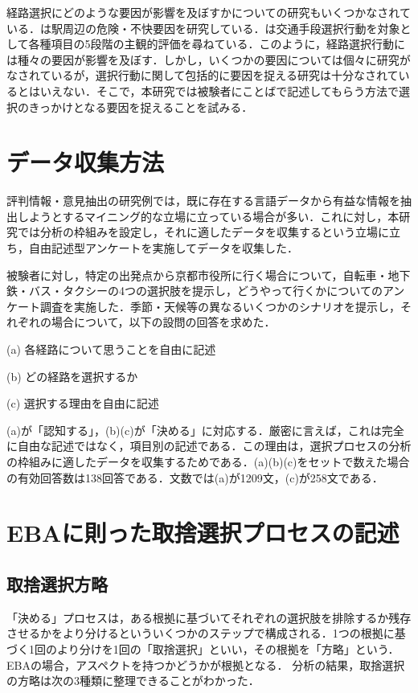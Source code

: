 \documentclass[japanese]{jnlp_1.3a}
\begin{document}
経路選択にどのような要因が影響を及ぼすかについての研究もいくつかなされている．は駅周辺の危険・不快要因を研究している．は交通手段選択行動を対象として各種項目の5段階の主観的評価を尋ねている．このように，経路選択行動には種々の要因が影響を及ぼす．しかし，いくつかの要因については個々に研究がなされているが，選択行動に関して包括的に要因を捉える研究は十分なされているとはいえない．そこで，本研究では被験者にことばで記述してもらう方法で選択のきっかけとなる要因を捉えることを試みる．

\section{データ収集方法}
\label{sec:datacollect}

評判情報・意見抽出の研究例では，既に存在する言語データから有益な情報を抽出しようとするマイニング的な立場に立っている場合が多い．これに対し，本研究では分析の枠組みを設定し，それに適したデータを収集するという立場に立ち，自由記述型アンケートを実施してデータを収集した．

被験者に対し，特定の出発点から京都市役所に行く場合について，自転車・地下鉄・バス・タクシーの4つの選択肢を提示し，どうやって行くかについてのアンケート調査を実施した．季節・天候等の異なるいくつかのシナリオを提示し，それぞれの場合について，以下の設問の回答を求めた．
	\begin{description}
	\item{(a)} 各経路について思うことを自由に記述
	\item{(b)} どの経路を選択するか
	\item{(c)} 選択する理由を自由に記述
	\end{description}
(a)が「認知する」，(b)(c)が「決める」に対応する．厳密に言えば，これは完全に自由な記述ではなく，項目別の記述である．この理由は，選択プロセスの分析の枠組みに適したデータを収集するためである．(a)(b)(c)をセットで数えた場合の有効回答数は138回答である．文数では(a)が1209文，(c)が258文である．

\section{EBAに則った取捨選択プロセスの記述}
\label{sec:ebaprocess}

\subsection{取捨選択方略}

「決める」プロセスは，ある根拠に基づいてそれぞれの選択肢を排除するか残存させるかをより分けるといういくつかのステップで構成される．1つの根拠に基づく1回のより分けを1回の「取捨選択」といい，その根拠を「方略」という．EBAの場合，アスペクトを持つかどうかが根拠となる．
分析の結果，取捨選択の方略は次の3種類に整理できることがわかった．
\end{document}
